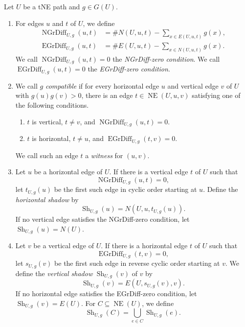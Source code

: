 \begin{definition}\label{def:compatible-grading}
Let $U$ be a tNE path and $g\in G(U)$.
\begin{enumerate}[font=\itshape]
\item\label{d:grading-differences} For edges $u$ and $t$ of $U$, we define
\[
\begin{aligned}
 \operatorname{NGrDiff}_{U,g}(u,t)
 &=\#N(U,u,t)-\sum_{x\in E(U,u,t)}g(x),\\
 \operatorname{EGrDiff}_{U,g}(u,t)
 &=\#E(U,u,t)-\sum_{x\in N(U,u,t)}g(x).
\end{aligned}
\]
We call $\operatorname{NGrDiff}_{U,g}(u,t)=0$ the \textit{NGrDiff-zero condition}.
We call $\operatorname{EGrDiff}_{U,g}(u,t)=0$ the \textit{EGrDiff-zero condition}.
\item\label{d:compatible} We call $g$ \textit{compatible} if for
every horizontal edge $u$ and vertical edge $v$ of $U$ with $g(u)g(v)>0$,
there is an edge $t\in \operatorname{NE}(U,u,v)$ satisfying one of the following conditions.
\begin{enumerate}[label=(\alph*),font=\itshape]
\item\label{d:compatibility-horizontal} $t$ is vertical, $t\ne v$,
and $\operatorname{NGrDiff}_{U,g}(u,t)=0$.
\item\label{d:compatibility-vertical} $t$ is horizontal, $t\ne u$,
and $\operatorname{EGrDiff}_{U,g}(t,v)=0$.
\end{enumerate}
We call such an edge $t$ a \textit{witness} for $(u,v)$.
\item\label{d:horizontal-shadow} Let $u$ be a horizontal edge of $U$.
If there is a vertical edge $t$ of $U$ such that
\[
 \operatorname{NGrDiff}_{U,g}(u,t)=0,
\]
let $t_{U,g}(u)$ be the first such edge in cyclic order starting at $u$.
Define the \textit{horizontal shadow} by
\[
 \operatorname{Sh}_{U,g}(u)=N(U,u,t_{U,g}(u)).
\]
If no vertical edge satisfies the NGrDiff-zero condition,
let $\operatorname{Sh}_{U,g}(u)=N(U)$.
\item\label{d:vertical-shadow} Let $v$ be a vertical edge of $U$.
If there is a horizontal edge $t$ of $U$ such that
\[
 \operatorname{EGrDiff}_{U,g}(t,v)=0,
\]
let $s_{U,g}(v)$ be the first such edge in reverse cyclic order starting at $v$.
We define the \textit{vertical shadow} $\operatorname{Sh}_{U,g}(v)$ of $v$ by
\[
 \operatorname{Sh}_{U,g}(v)=E(U,s_{U,g}(v),v).
\]
If no horizontal edge satisfies the EGrDiff-zero condition,
let $\operatorname{Sh}_{U,g}(v)=E(U)$.
For $C\subseteq\operatorname{NE}(U)$, we define
\[
 \operatorname{Sh}_{U,g}(C)=\bigcup_{e\in C}\operatorname{Sh}_{U,g}(e).
\]
\end{enumerate}
\end{definition}
